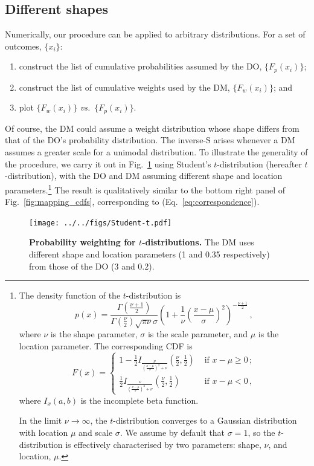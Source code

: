 \documentclass[12pt,letter,timesnewroman]{article}
\newcommand{\eref}[1]{(Eq.~\ref{eq:#1})}
\newcommand{\flabel}[1]{\label{fig:#1}}
\newcommand{\fref}[1]{Fig.~\ref{fig:#1}}
\newcommand{\seclabel}[1]{\label{sec:#1}}
\newcommand{\vs}{\textit{vs.}\ }
\newcommand{\be}{\begin{equation}}
\newcommand{\ee}{\end{equation}}
\begin{document}

\subsection{Different shapes\seclabel{Different_shapes}}
Numerically, our procedure can be applied to arbitrary distributions. For a set of outcomes, $\{x_i\}$:
\begin{enumerate}
\item
construct the list of cumulative probabilities assumed by the DO, $\{F_p(x_i)\}$;
\item
construct the list of cumulative weights used by the DM, $\{F_w(x_i)\}$; and
\item
plot $\{F_w(x_i)\}$ \vs $\{F_p(x_i)\}$.
\end{enumerate}
Of course, the DM could assume a weight distribution whose shape differs from that of the DO's probability distribution.
The inverse-S arises whenever a DM assumes a greater scale for a unimodal distribution.
To illustrate the generality of the procedure, we carry it out in \fref{Student-t} using Student's $t$-distribution (hereafter $t$-distribution), with the DO and DM assuming different shape and location parameters.\footnote{
The density function of the $t$-distribution is
%
\be
p\left(x\right) = \frac{\Gamma\left(\frac{\nu+1}{2}\right)} {\Gamma\left(\frac{\nu}{2}\right)\sqrt{\pi\nu}\sigma} \left(1+\frac{1}{\nu}\left(\frac{x-\mu}{\sigma}\right)^2 \right)^{-\frac{\nu+1}{2}}\,,
\ee
%
where $\nu$ is the shape parameter, $\sigma$ is the scale parameter, and $\mu$ is the location parameter. The corresponding CDF is
%
\be
F\left(x\right) =
\begin{cases}
1 - \frac{1}{2} I_{\frac{\nu}{\left(\frac{x-\mu}{\sigma}\right)^2 + \nu}}\left(\frac{\nu}{2},\frac{1}{2}\right) &\text{ if } x-\mu \geq 0\,;\\
\frac{1}{2} I_{\frac{\nu}{\left(\frac{x-\mu}{\sigma}\right)^2 + \nu}}\left(\frac{\nu}{2},\frac{1}{2}\right) &\text{ if } x-\mu < 0\,,
\end{cases}
\ee
%
where $I_x\left(a,b\right)$ is the incomplete beta function.

In the limit $\nu \rightarrow \infty$, the $t$-distribution converges to a Gaussian distribution with location $\mu$ and scale $\sigma$. We assume by default that $\sigma = 1$, so the $t$-distribution is effectively characterised by two parameters: shape, $\nu$, and location, $\mu$.
}
The result is qualitatively similar to the bottom right panel of \fref{mapping_cdfs}, corresponding to \eref{correspondence}.
\begin{figure}[!htb]
\centering
\texttt{[image: ../../figs/Student-t.pdf]}
\caption{\textbf{Probability weighting for $t$-distributions.} The DM uses different shape and location parameters (1 and 0.35 respectively) from those of the DO (3 and 0.2).}
\flabel{Student-t}
\end{figure}
\end{document}
